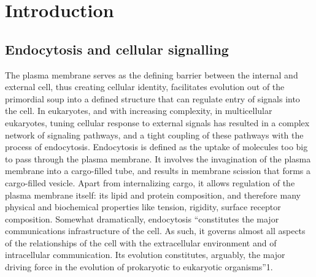 \chapter{Introduction} %

\label{Ch:Aims} %


\section{Endocytosis and cellular signalling}
The plasma membrane serves as the defining barrier between the internal and external cell, thus creating cellular identity, facilitates evolution out of the primordial soup into a defined structure that can regulate entry of signals into the cell. In eukaryotes, and with increasing complexity, in multicellular eukaryotes, tuning cellular response to external signals has resulted in a complex network of signaling pathways, and a tight coupling of these pathways with the process of endocytosis. Endocytosis is defined as the uptake of molecules too big to pass through the plasma membrane. It involves the invagination of the plasma membrane into a cargo-filled tube, and results in membrane scission that forms a cargo-filled vesicle. Apart from internalizing cargo, it allows regulation of the plasma membrane itself: its lipid and protein composition, and therefore many physical and biochemical properties like tension, rigidity, surface receptor composition. Somewhat dramatically, endocytosis “constitutes the major communications infrastructure of the cell. As such, it governs almost all aspects of the relationships of the cell with the extracellular environment and of intracellular communication. Its evolution constitutes, arguably, the major driving force in the evolution of prokaryotic to eukaryotic organisms”1.



